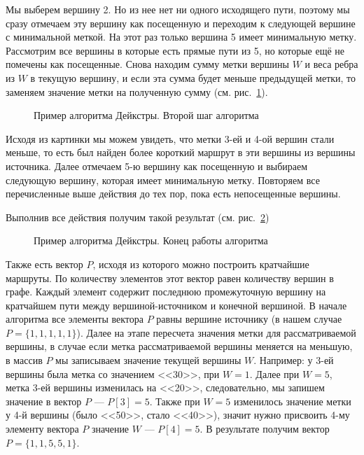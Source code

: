 Мы выберем вершину 2. 
Но из нее нет ни одного исходящего пути, поэтому мы сразу отмечаем эту вершину как посещенную и переходим к следующей вершине с минимальной меткой. 
На этот раз только вершина 5 имеет минимальную метку. 
Рассмотрим все вершины в которые есть прямые пути из 5, но которые ещё не помечены как посещенные. 
Снова находим сумму метки вершины $W$ и веса ребра из $W$ в текущую вершину, и если эта сумма будет меньше предыдущей метки, то заменяем значение метки на полученную сумму (см. рис.~\ref{ris:ad-4}).

\begin{figure}[ht]
\caption{Пример алгоритма Дейкстры. Второй шаг алгоритма}
\label{ris:ad-4}
\end{figure}

Исходя из картинки мы можем увидеть, что метки 3-ей и 4-ой вершин стали меньше, то есть был найден более короткий маршрут в эти вершины из вершины источника. 
Далее отмечаем 5-ю вершину как посещенную и выбираем следующую вершину, которая имеет минимальную метку.
Повторяем все перечисленные выше действия до тех пор, пока есть непосещенные вершины.

Выполнив все действия получим такой результат (см. рис.~\ref{ris:ad-5})
\begin{figure}[ht]
\caption{Пример алгоритма Дейкстры. Конец работы алгоритма}
\label{ris:ad-5}
\end{figure}

Также есть вектор $P$, исходя из которого можно построить кратчайшие маршруты. 
По количеству элементов этот вектор равен количеству вершин в графе.
Каждый элемент содержит последнюю промежуточную вершину на кратчайшем пути между вершиной-источником и конечной вершиной. 
В начале алгоритма все элементы вектора $P$ равны вершине источнику (в нашем случае $P = \{1, 1, 1, 1, 1\}$).
Далее на этапе пересчета значения метки для рассматриваемой вершины, в случае если метка рассматриваемой вершины меняется на меньшую, в массив $P$ мы записываем значение текущей вершины $W$. 
Например: у 3-ей вершины была метка со значением <<30>>, при $W=1$. 
Далее при $W=5$, метка 3-ей вершины изменилась на <<20>>, следовательно, мы запишем значение в вектор $P$ --- $P[3]=5$. 
Также при $W=5$ изменилось значение метки у 4-й вершины (было <<50>>, стало <<40>>), значит нужно присвоить 4-му элементу вектора $P$ значение $W$ --- $P[4]=5$. 
В результате получим вектор $P = \{1, 1, 5, 5, 1\}$. 

